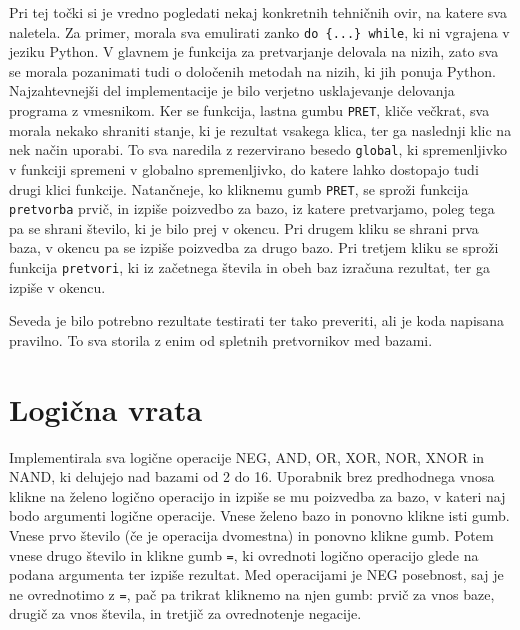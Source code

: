 \documentclass[12pt]{article}
\begin{document}
	Pri tej točki si je vredno pogledati nekaj konkretnih tehničnih ovir, na katere sva naletela. Za primer, morala sva emulirati zanko \texttt{do \{...\} while}, ki ni vgrajena v jeziku Python.\cite{dowhile} V glavnem je funkcija za pretvarjanje delovala na nizih, zato sva se morala pozanimati tudi o določenih metodah na nizih, ki jih ponuja Python.\cite{split, prepend} Najzahtevnejši del implementacije je bilo verjetno usklajevanje delovanja programa z vmesnikom. Ker se funkcija, lastna gumbu \texttt{PRET}, kliče večkrat, sva morala nekako shraniti stanje, ki je rezultat vsakega klica, ter ga naslednji klic na nek način uporabi. To sva naredila z rezervirano besedo \texttt{global},\cite{global} ki spremenljivko v funkciji spremeni v globalno spremenljivko, do katere lahko dostopajo tudi drugi klici funkcije. Natančneje, ko kliknemu gumb \texttt{PRET}, se sproži funkcija \texttt{pretvorba} prvič, in izpiše poizvedbo za bazo, iz katere pretvarjamo, poleg tega pa se shrani število, ki je bilo prej v okencu. Pri drugem kliku se shrani prva baza, v okencu pa se izpiše poizvedba za drugo bazo. Pri tretjem kliku se sproži funkcija \texttt{pretvori}, ki iz začetnega števila in obeh baz izračuna rezultat, ter ga izpiše v okencu.
	
	Seveda je bilo potrebno rezultate testirati ter tako preveriti, ali je koda napisana pravilno. To sva storila z enim od spletnih pretvornikov med bazami.\cite{pret}
	
	\section{Logična vrata}
	
	Implementirala sva logične operacije NEG, AND, OR, XOR, NOR, XNOR in NAND, ki delujejo nad bazami od 2 do 16. Uporabnik brez predhodnega vnosa klikne na želeno logično operacijo in izpiše se mu poizvedba za bazo, v kateri naj bodo argumenti logične operacije. Vnese želeno bazo in ponovno klikne isti gumb. Vnese prvo število (če je operacija dvomestna) in ponovno klikne gumb. Potem vnese drugo število in klikne gumb \texttt{=}, ki ovrednoti logično operacijo glede na podana argumenta ter izpiše rezultat. Med operacijami je NEG posebnost, saj je ne ovrednotimo z \texttt{=}, pač pa trikrat kliknemo na njen gumb: prvič za vnos baze, drugič za vnos števila, in tretjič za ovrednotenje negacije.
	
\end{document}

